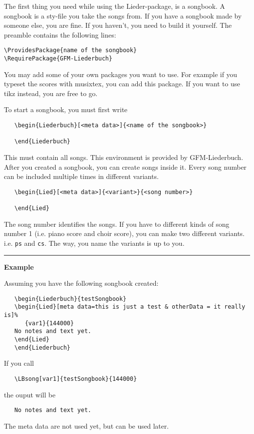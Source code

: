 \documentclass[12pt,a4paper]{scrreprt}
\begin{document}
The first thing you need while using the Lieder-package, is a songbook. A songbook is a sty-file you take the songs from. If you have a songbook made by someone else, you are fine. If you haven't, you need to build it yourself. The preamble contains the following lines:
\begin{verbatim}
\ProvidesPackage{name of the songbook}
\RequirePackage{GFM-Liederbuch}
\end{verbatim}
You may add some of your own packages you want to use. For example if you typeset the scores with musixtex, you can add this package. If you want to use tikz instead, you are free to go.

To start a songbook, you must first write
\begin{verbatim}
   \begin{Liederbuch}[<meta data>]{<name of the songbook>}

   \end{Liederbuch}
\end{verbatim}
This must contain all songs. This environment is provided by GFM-Liederbuch. After you created a songbook, you can create songs inside it. Every song number can be included multiple times in different variants. 
\begin{verbatim}
   \begin{Lied}[<meta data>]{<variant>}{<song number>}

   \end{Lied}
\end{verbatim}
The song number identifies the songs. If you have to different kinds of song number 1 (i.e. piano score and choir score), you can make two different variants. i.e. \verb+ps+ and \verb+cs+. The way, you name the variants is up to you.

\noindent\rule{\textwidth}{1pt}

{\Large \textbf{Example}}

\noindent Assuming you have the following songbook created:
\begin{verbatim}
   \begin{Liederbuch}{testSongbook}
   \begin{Lied}[meta data=this is just a test & otherData = it really is]%
      {var1}{144000}
   No notes and text yet.
   \end{Lied}
   \end{Liederbuch}
\end{verbatim}
If you call
\begin{verbatim}
   \LBsong[var1]{testSongbook}{144000}
\end{verbatim}
the ouput will be
\begin{verbatim}
   No notes and text yet.
\end{verbatim}
The meta data are not used yet, but can be used later.\vspace*{-2ex}
\end{document}
